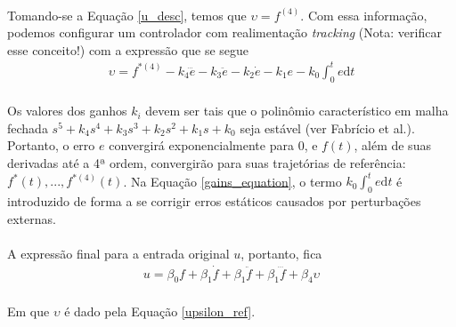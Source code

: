 \documentclass[a4paper,11pt]{scrartcl} %
\numberwithin{equation}{section} %
\numberwithin{figure}{section} %
\numberwithin{table}{section} %
\begin{document}
\paragraph{} Tomando-se a Equação \ref{u_desc}, temos que $\upsilon = f^{(4)}$. Com essa informação, podemos configurar um controlador com realimentação \textit{tracking} (Nota: verificar esse conceito!) com a expressão que se segue %
\begin{align}
\label{gains_equation}
\upsilon = f^{*(4)} - k_{4}\dddot{e} - k_{3}\ddot{e} - k_{2}\dot{e} - k_{1}e - k_{0}\int_{0}^{t} \! e \mathrm{d}t
\end{align}
\paragraph{} Os valores dos ganhos $k_i$ devem ser tais que o polinômio característico em malha fechada $s^5 + k_{4}s^4 + k_{3}s^3 + k_{2}s^2 + k_{1}s + k_{0}$ seja estável (ver Fabrício et al.). Portanto, o erro $e$ convergirá exponencialmente para 0, e $f(t)$, além de suas derivadas até a 4ª ordem, convergirão para suas trajetórias de referência: $f^*(t) ,..., f^{*(4)}(t)$. Na Equação \ref{gains_equation}, o termo $k_{0}\int_{0}^{t} \! e \mathrm{d}t$ é introduzido de forma a se corrigir erros estáticos causados por perturbações externas.
\paragraph{} A expressão final para a entrada original $u$, portanto, fica
\begin{align}
u = \beta_{0}f + \beta_{1}\dot{f} + \beta_{1}\ddot{f} + \beta_{1}\dddot{f} + \beta_{4}\upsilon
\end{align}
\paragraph{} Em que $\upsilon$ é dado pela Equação \ref{upsilon_ref}.
\end{document}
